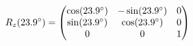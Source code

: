 \documentclass[preview]{standalone}
\begin{document}
\begin{align*}
\special{dvisvgm:raw <g id='unique000'>}R_z(23.9^\circ) = \begin{pmatrix} \cos(23.9^\circ) & -\sin(23.9^\circ) & 0 \\ \sin(23.9^\circ) & \cos(23.9^\circ) & 0 \\ 0 & 0 & 1 \end{pmatrix}\special{dvisvgm:raw </g>}
\end{align*}
\end{document}
